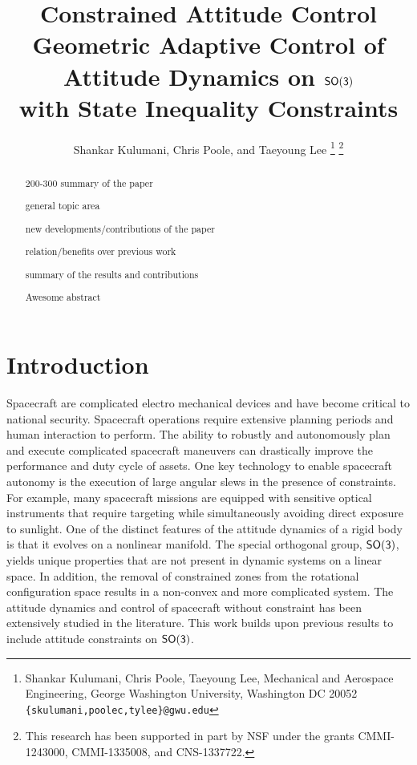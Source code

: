\documentclass[letterpaper, 10 pt, conference]{ieeeconf}  %
\title{\LARGE \bf
Constrained Attitude Control
}
\title{\LARGE \bf
Geometric Adaptive Control of Attitude Dynamics on $\mathsf{SO(3)}$\\ with State Inequality Constraints}
\author{Shankar Kulumani, Chris Poole, and Taeyoung Lee
\thanks{Shankar Kulumani, Chris Poole, Taeyoung Lee, Mechanical and Aerospace Engineering, George Washington University, Washington DC 20052 {\tt \{skulumani,poolec,tylee\}@gwu.edu}}
\thanks{This research has been supported in part by NSF under the grants CMMI-1243000, CMMI-1335008, and CNS-1337722.}
}
\begin{document}
\maketitle
\thispagestyle{empty}
\pagestyle{empty}


\begin{abstract}

200-300 summary of the paper

general topic area

new developments/contributions of the paper

relation/benefits over previous work

summary of the results and contributions

Awesome abstract

\end{abstract}


\section{Introduction}

Spacecraft are complicated electro mechanical devices and have become critical to national security.
Spacecraft operations require extensive planning periods and human interaction to perform.
The ability to robustly and autonomously plan and execute complicated spacecraft maneuvers can drastically improve the performance and duty cycle of assets.
One key technology to enable spacecraft autonomy is the execution of large angular slews in the presence of constraints.
For example, many spacecraft missions are equipped with sensitive optical instruments that require targeting while simultaneously avoiding direct exposure to sunlight.
One of the distinct features of the attitude dynamics of a rigid body is that it evolves on a nonlinear manifold.
The special orthogonal group, \( \mathsf{SO(3)} \), yields unique properties that are not present in dynamic systems on a linear space. 
In addition, the removal of constrained zones from the rotational configuration space results in a non-convex and more complicated system.
The attitude dynamics and control of spacecraft without constraint has been extensively studied in the literature.
This work builds upon previous results to include attitude constraints on \( \mathsf{SO(3)} \).
\end{document}
